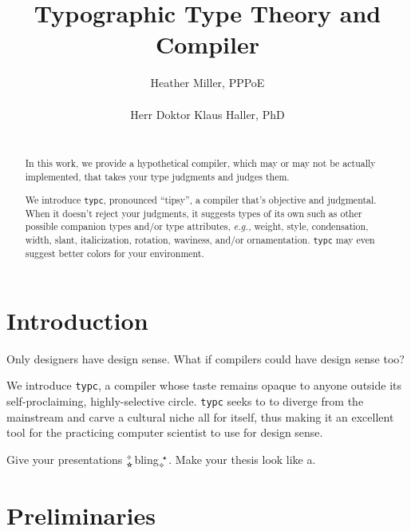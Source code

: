 \documentclass{acm_proc_article-sp}
\newcommand{\bling}{{\small\ding{71}}$^{\tiny\rotatebox[origin=c]{45}{\wasylozenge}}_\text{\ding{75}}$\normalsize bling$_{\tiny\rotatebox[origin=c]{45}{\wasylozenge}}^{~\star}${\small\ding{84}}}
\begin{document}
\title{Typographic Type Theory and Compiler}


\author{
\alignauthor
Heather Miller, PPPoE\\
       \\
\alignauthor
Herr Doktor Klaus Haller, PhD\\
       \\
}


\maketitle
\begin{abstract}

In this work, we provide a hypothetical compiler, which may or may not be
actually implemented, that takes your type judgments and judges them.

We introduce \texttt{typc}, pronounced ``tipsy'', a compiler that's objective
and judgmental. When it doesn't reject your judgments, it suggests types of
its own such as other possible companion types and/or type attributes, {\em
e.g.,} weight, style, condensation, width, slant, italicization, rotation,
waviness, and/or ornamentation. \texttt{typc} may even suggest better colors
for your environment. \end{abstract}

\section{Introduction}

Only designers have design sense. What if compilers could have design sense too?

We introduce \texttt{typc}, a compiler whose taste remains opaque to anyone
outside its self-proclaiming, highly-selective circle. \texttt{typc} seeks to
to diverge from the mainstream and carve a cultural niche all for itself, thus
making it an excellent tool for the practicing computer scientist to use for
design sense.

Give your presentations \bling. Make your thesis look like a.

\section{Preliminaries}
\end{document}
